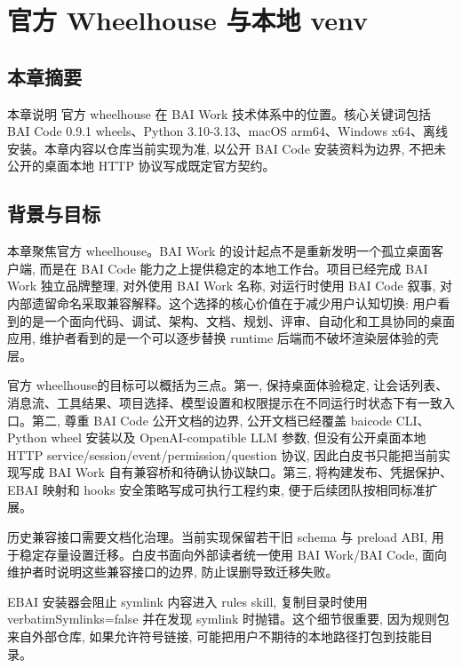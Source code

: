 \chapter{官方 Wheelhouse 与本地 venv}
\section{本章摘要}
本章说明 官方 wheelhouse 在 BAI Work 技术体系中的位置。核心关键词包括 BAI Code 0.9.1 wheels、Python 3.10-3.13、macOS arm64、Windows x64、离线安装。本章内容以仓库当前实现为准, 以公开 BAI Code 安装资料为边界, 不把未公开的桌面本地 HTTP 协议写成既定官方契约。

\section{背景与目标}
本章聚焦官方 wheelhouse。BAI Work 的设计起点不是重新发明一个孤立桌面客户端, 而是在 BAI Code 能力之上提供稳定的本地工作台。项目已经完成 BAI Work 独立品牌整理, 对外使用 BAI Work 名称, 对运行时使用 BAI Code 叙事, 对内部遗留命名采取兼容解释。这个选择的核心价值在于减少用户认知切换: 用户看到的是一个面向代码、调试、架构、文档、规划、评审、自动化和工具协同的桌面应用, 维护者看到的是一个可以逐步替换 runtime 后端而不破坏渲染层体验的壳层。

官方 wheelhouse的目标可以概括为三点。第一, 保持桌面体验稳定, 让会话列表、消息流、工具结果、项目选择、模型设置和权限提示在不同运行时状态下有一致入口。第二, 尊重 BAI Code 公开文档的边界, 公开文档已经覆盖 baicode CLI、Python wheel 安装以及 OpenAI-compatible LLM 参数, 但没有公开桌面本地 HTTP service/session/event/permission/question 协议, 因此白皮书只能把当前实现写成 BAI Work 自有兼容桥和待确认协议缺口。第三, 将构建发布、凭据保护、EBAI 映射和 hooks 安全策略写成可执行工程约束, 便于后续团队按相同标准扩展。

历史兼容接口需要文档化治理。当前实现保留若干旧 schema 与 preload ABI, 用于稳定存量设置迁移。白皮书面向外部读者统一使用 BAI Work/BAI Code, 面向维护者时说明这些兼容接口的边界, 防止误删导致迁移失败。

EBAI 安装器会阻止 symlink 内容进入 rules skill, 复制目录时使用 verbatimSymlinks=false 并在发现 symlink 时抛错。这个细节很重要, 因为规则包来自外部仓库, 如果允许符号链接, 可能把用户不期待的本地路径打包到技能目录。

